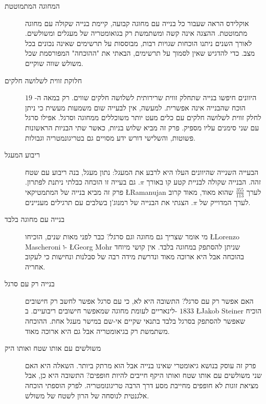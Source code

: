 \begin{description}
\item[המחוגה המתמוטטת]
אוקלידס הראה שעבור כל בנייה עם מחוגה קבועה, קיימת בנייה שקולה עם מחוגה מתמוטטת. ההצגה אינה קשה ומשתמשת רק בגואומטריה של מעגלים ומשולשים. לאורך השנים ניתנו הוכחות שגויות רבות, מבוססות על תרשימים שאינה נכונים בכל מצב. כדי להדגיש שאין לסמוך על תרשימים, הבאתי את "ההוכחה" המפורסמת שכל משולש שווה שוקיים.
\item[חלוקת זווית לשלושה חלקים]
היוונים חיפשו בנייה שתחלק זווית שרירותית לשלושה חלקים שווים. רק במאה ה-%
$19$
הוכח שהבנייה אינה אפשרית. למעשה, אין לבעייה שום משמעות מעשית כי ניתן לחלק זווית לשלושה חלקים עם כלים מעט יותר משוכללים ממחוגה וסרגל. אפילו סרגל עם שני סימנים עליו מספיק. פרק זה מביא שלוש בניות, כאשר שתי הבניות הראשונות פשוטות, והשלישי דורש ידע מסויים גם בטריגונמטריה וגבולות.

\item[ריבוע המעגל]
הבעייה השנייה שהיוונים העלו היא לרבע את המעגל: נתון מעגל, בנה ריבוע עם שטח זהה. הבנייה שקולה לבניית קטע קו באורך 
$\pi$.
גם בעייה זו הוכחה כבלתי ניתנת לפתרון. פרק זה מביא בנייה של המתמטיקאי
\L{Ramanujan}
לערך
$\displaystyle\frac{355}{113}$
שהוא מאוד, מאוד קרוב לערך המדוייק של
$\pi$.
הצגתי את הבנייה של רמנוג'ן בשלבים עם תרגילים מעניינים.

\item[בנייה עם מחוגה בלבד]
מי אומר שצריך גם מחוגה וגם סרגל? כבר לפני מאות שנים, הוכיחו
\L{Lorenzo Mascheroni}
ו-%
\L{Georg Mohr}
שניתן להסתפק במחוגה בלבד. אין קושי מיוחד בהוכחה אבל היא ארוכה מאוד ונדרשת מידה רבה של סבלנות ונחישות כי לעקוב אחריה.

\item[בנייה רק עם סרגל]
האם אפשר רק עם סרגל? התשובה היא לא, כי עם סרגל אפשר לחשב רק חישובים לינאריים לעומת מחוגה שמאפשר חישובים ריבועיים. ב-%
$1833$
\L{Jakob Steiner}
הוכיח שאפשר להסתפק בסרגל בלבד בתנאי שקיים אי-שם במישר מעגל אחת. ההוכחה משתמשת רק בגיאומטריה אבל גם היא ארוכה מאוד.

\item[משולשים עם אותו שטח ואותו היק]
פרק זה עוסק בנושא גיאומטרי שאינו בנייה אבל הוא מרתק ביותר. השאלה היא האם שני משולשים עם אותו שטח ואותו היקף חייבים להיות חופפים? התשובה היא כן, אבל מציאת זוגות לא חופפים מחייבת מסע דרך הרבה טריגונומטריה. לפרק הוספתי הוכחה אלגנטית לנוסחה של הרון לשטח של משולש.

\end{description}

